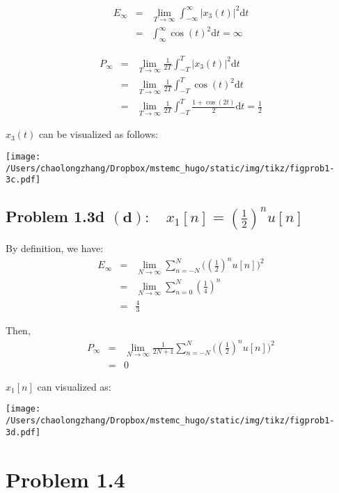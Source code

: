 \documentclass[koma,a4paper,utopia,12pt,listings-color,microtype,paralist,colorlinks,urlcolor=red]{org-article}
\begin{document}
\begin{eqnarray*}
E_{\infty}&=& \lim_{T\to\infty} \int_{-\infty}^{\infty} |x_{3}(t)|^{2} \mathrm{d}t \\
&=& \int_{\infty}^{\infty} \cos(t)^{2} \mathrm{d}t = \infty
\end{eqnarray*}

\begin{eqnarray*}
P_{\infty}&=& \lim_{T\to\infty} \frac{1}{2T}\int_{-T}^{T} |x_{3}(t)|^{2} \mathrm{d}t  \\
&=& \lim_{T\to\infty}\frac{1}{2T} \int_{-T}^{T} \cos(t)^{2} \mathrm{d}t \\
&=& \lim_{T\to\infty} \frac{1}{2T} \int_{-T}^{T} \frac{1+\cos(2t)}{2} \mathrm{d}t = \frac{1}{2}
\end{eqnarray*}

\(x_{3}(t)\)  can be visualized as follows:

\begin{center}
\texttt{[image: /Users/chaolongzhang/Dropbox/mstemc\_hugo/static/img/tikz/figprob1-3c.pdf]}
\end{center}

\subsection{Problem 1.3d \(\mathbf{(d):} \quad x_{1}[n] = (\tfrac{1}{2})^{n} u[n]\)}
\label{sec:org9332415}

By definition, we have:
\begin{eqnarray*}
E_{\infty}&=&\lim_{N\to\infty}\sum_{n=-N}^{N} \big((\tfrac{1}{2})^{n}u[n]\big)^{2} \\
&=&\lim_{N\to\infty}\sum_{n=0}^{N} (\tfrac{1}{4})^{n} \\
&=& \tfrac{4}{3}
\end{eqnarray*}

Then,
\begin{eqnarray*}
P_{\infty}&=& \lim_{N\to\infty} \frac{1}{2N+1} \sum_{n=-N}^{N} \big((\tfrac{1}{2})^{n}u[n]\big)^{2}   \\
&=& 0
\end{eqnarray*}

\(x_{1}[n]\) can visualized as:
\begin{center}
\texttt{[image: /Users/chaolongzhang/Dropbox/mstemc\_hugo/static/img/tikz/figprob1-3d.pdf]}
\end{center}




\section{Problem 1.4}
\label{sec:orgcfde750}
\end{document}
